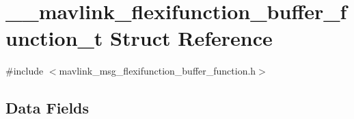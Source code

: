 \hypertarget{struct____mavlink__flexifunction__buffer__function__t}{\section{\+\_\+\+\_\+mavlink\+\_\+flexifunction\+\_\+buffer\+\_\+function\+\_\+t Struct Reference}
\label{struct____mavlink__flexifunction__buffer__function__t}
}


{\ttfamily \#include $<$mavlink\+\_\+msg\+\_\+flexifunction\+\_\+buffer\+\_\+function.\+h$>$}

\subsection*{Data Fields}
